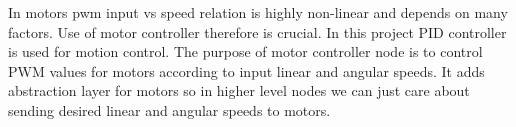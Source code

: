 In motors pwm input vs speed relation is highly non-linear and depends on many factors. Use of motor controller therefore is crucial. In this project PID controller is used for motion control. The purpose of motor controller node is to control PWM values for motors according to input linear and angular speeds. It adds abstraction layer for motors so in higher level nodes we can just care about sending desired linear and angular speeds to motors.